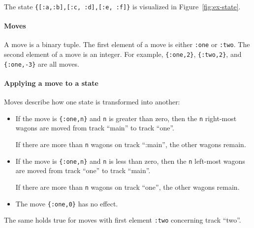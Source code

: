 \documentclass[a4paper,11pt]{article}
\begin{document}
The state \verb+{[:a,:b],[:c, :d],[:e, :f]}+
is visualized in Figure~\ref{fig:ex-state}.

\paragraph{Moves}

A move is a binary tuple. The first element of a move is either
\verb+:one+ or \verb+:two+. The second element of a move is an
integer. For example, \verb+{:one,2}+, \verb+{:two,2}+, and
\verb+{:one,-3}+ are all moves.

\paragraph{Applying a move to a state}

Moves describe how one state is transformed into another:
\begin{itemize}
\item If the move is \verb+{:one,n}+ and \verb+n+ is greater than
  zero, then the \verb+n+ right-most wagons are moved from track
  ``main'' to track ``one''.

  If there are more than \verb+n+ wagons on track ``:main'', the
  other wagons remain.

\item If the move is \verb+{:one,n}+ and \verb+n+ is less than zero,
  then the \verb+n+ left-most wagons are moved from track ``one''
  to track ``main''.

  If there are more than \verb+n+ wagons on track ``one'', the
  other wagons remain.
\item The move \verb+{:one,0}+ has no effect.
\end{itemize}

The same holds true for moves with first element \verb+:two+
concerning track ``two''.
\end{document}

